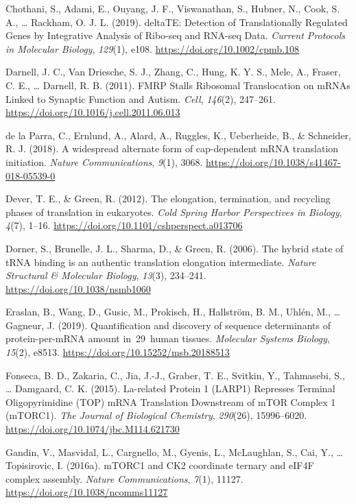\documentclass[12pt,openany]{book}
\begin{document}
\hypertarget{ref-Chothani2019}{}
Chothani, S., Adami, E., Ouyang, J. F., Viswanathan, S., Hubner, N.,
Cook, S. A., \ldots{} Rackham, O. J. L. (2019). deltaTE: Detection of
Translationally Regulated Genes by Integrative Analysis of Ribo-seq and
RNA-seq Data. \emph{Current Protocols in Molecular Biology},
\emph{129}(1), e108. \url{https://doi.org/10.1002/cpmb.108}

\hypertarget{ref-Darnell2011}{}
Darnell, J. C., Van Driesche, S. J., Zhang, C., Hung, K. Y. S., Mele,
A., Fraser, C. E., \ldots{} Darnell, R. B. (2011). FMRP Stalls Ribosomal
Translocation on mRNAs Linked to Synaptic Function and Autism.
\emph{Cell}, \emph{146}(2), 247--261.
\url{https://doi.org/10.1016/j.cell.2011.06.013}

\hypertarget{ref-delaParra2018}{}
de la Parra, C., Ernlund, A., Alard, A., Ruggles, K., Ueberheide, B., \&
Schneider, R. J. (2018). A widespread alternate form of cap-dependent
mRNA translation initiation. \emph{Nature Communications}, \emph{9}(1),
3068. \url{https://doi.org/10.1038/s41467-018-05539-0}

\hypertarget{ref-Dever2012}{}
Dever, T. E., \& Green, R. (2012). The elongation, termination, and
recycling phases of translation in eukaryotes. \emph{Cold Spring Harbor
Perspectives in Biology}, \emph{4}(7), 1--16.
\url{https://doi.org/10.1101/cshperspect.a013706}

\hypertarget{ref-Dorner2006}{}
Dorner, S., Brunelle, J. L., Sharma, D., \& Green, R. (2006). The hybrid
state of tRNA binding is an authentic translation elongation
intermediate. \emph{Nature Structural \& Molecular Biology},
\emph{13}(3), 234--241. \url{https://doi.org/10.1038/nsmb1060}

\hypertarget{ref-Eraslan2019}{}
Eraslan, B., Wang, D., Gusic, M., Prokisch, H., Hallström, B. M., Uhlén,
M., \ldots{} Gagneur, J. (2019). Quantification and discovery of
sequence determinants of protein-per-mRNA amount in~29~human tissues.
\emph{Molecular Systems Biology}, \emph{15}(2), e8513.
\url{https://doi.org/10.15252/msb.20188513}

\hypertarget{ref-Fonseca2015}{}
Fonseca, B. D., Zakaria, C., Jia, J.-J., Graber, T. E., Svitkin, Y.,
Tahmasebi, S., \ldots{} Damgaard, C. K. (2015). La-related Protein 1
(LARP1) Represses Terminal Oligopyrimidine (TOP) mRNA Translation
Downstream of mTOR Complex 1 (mTORC1). \emph{The Journal of Biological
Chemistry}, \emph{290}(26), 15996--6020.
\url{https://doi.org/10.1074/jbc.M114.621730}

\hypertarget{ref-Gandin2016}{}
Gandin, V., Masvidal, L., Cargnello, M., Gyenis, L., McLaughlan, S.,
Cai, Y., \ldots{} Topisirovic, I. (2016a). mTORC1 and CK2 coordinate
ternary and eIF4F complex assembly. \emph{Nature Communications},
\emph{7}(1), 11127. \url{https://doi.org/10.1038/ncomms11127}
\end{document}
